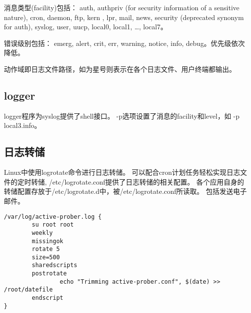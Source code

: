 消息类型(facility)包括：
auth, authpriv (for security information of a sensitive nature), cron, daemon, ftp, kern , 
lpr, mail, news, security (deprecated synonym for auth), syslog, user, uucp, 
local0, local1, \ldots,  local7。


错误级别包括： emerg, alert, crit, err, warning, notice, info, debug。优先级依次降低。

动作域即日志文件路径，如为星号则表示在各个日志文件、用户终端都输出。



\subsection{logger}
logger程序为syslog提供了shell接口。
-p选项设置了消息的facility和level，如 -p local3.info。

\subsection{日志转储}
Linux中使用logrotate命令进行日志转储。
可以配合cron计划任务轻松实现日志文件的定时转储, /etc/logrotate.conf提供了日志转储的相关配置。
各个应用自身的转储配置存放于/etc/logrotate.d中，被/etc/logrotate.conf所读取。
包括发送电子邮件。

\begin{verbatim}
/var/log/active-prober.log {
        su root root
        weekly
        missingok
        rotate 5
        size=500
        sharedscripts
        postrotate
                echo "Trimming active-prober.conf", $(date) >> /root/datefile
        endscript
}
\end{verbatim}











